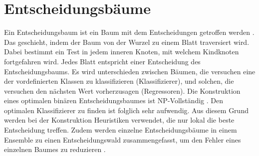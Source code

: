 \chapter{Entscheidungsbäume}
\label{chapter:decision_trees}
Ein Entscheidungsbaum ist ein Baum mit dem Entscheidungen getroffen werden \cite{quinlan1990decision}. Das geschieht, indem der Baum von der Wurzel zu einem Blatt traversiert wird. Dabei bestimmt ein
Test in jedem inneren Knoten, mit welchem Kindknoten fortgefahren wird. Jedes Blatt entspricht einer Entscheidung des Entscheidungsbaums. Es wird unterschieden zwischen Bäumen, die versuchen eine der
vordefinierten Klassen zu klassifizieren (Klassifizierer), und solchen, die versuchen den nächsten Wert vorherzusagen (Regressoren).
\newline
\newline
Die Konstruktion eines optimalen binären Entscheidungsbaumes ist NP-Vollständig \cite{laurent1976constructing}. Den optimalen Klassifizierer zu finden ist folglich sehr aufwendig.
Aus diesem Grund werden bei der Konstruktion Heuristiken verwendet, die nur lokal die beste Entscheidung treffen. Zudem werden einzelne Entscheidungsbäume in einem Ensemble zu einen
Entscheidungswald zusammengefasst, um den Fehler eines einzelnen Baumes zu reduzieren \cite{ScikitLearnEnsemble}.






